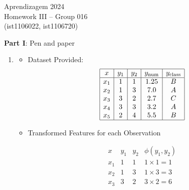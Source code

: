 \documentclass[12pt]{article}
\begin{document}
\center
Aprendizagem 2024\\
Homework III -- Group 016\\
(ist1106022, ist1106720)\vskip 1cm

\large{\textbf{Part I}: Pen and paper}\normalsize
\begin{enumerate}[leftmargin=\labelsep, label=\textbf{\arabic*.)}]
    \item \begin{itemize}
              \item Dataset Provided:
                    \[\begin{array}{|c|c|c|c|c|}
                            \hline
                            x   & y_1 & y_2 & y_{\text{num}} & y_{\text{class}} \\
                            \hline
                            x_1 & 1   & 1   & 1.25           & B                \\
                            x_2 & 1   & 3   & 7.0            & A                \\
                            x_3 & 3   & 2   & 2.7            & C                \\
                            x_4 & 3   & 3   & 3.2            & A                \\
                            x_5 & 2   & 4   & 5.5            & B                \\
                            \hline
                        \end{array}\]
                    \vspace{0.5em}
              \item Transformed Features for each Observation \\
                    \vspace{0.5em}
                    \begin{minipage}{1\textwidth}
                        \begin{center}
                            \[\begin{array}{|c|c|c|c|c}
                                    \hline
                                    x   & y_1 & y_2 & \phi(y_1, y_2) \\
                                    \hline
                                    x_1 & 1   & 1   & 1 \times 1 = 1 \\
                                    x_2 & 1   & 3   & 1 \times 3 = 3 \\
                                    x_3 & 3   & 2   & 3 \times 2 = 6 \\

\end{array}\]
\end{center}
\end{minipage}
\end{itemize}
\end{enumerate}
\end{document}
